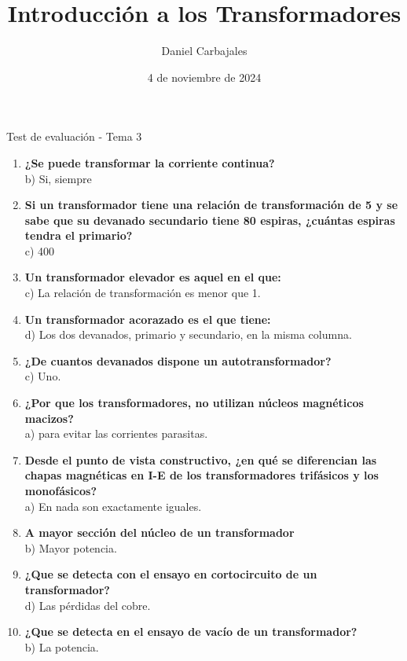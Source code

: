 \documentclass[spanish]{report}
\title{\Huge{Introducción a los Transformadores}}
\author{\large{Daniel Carbajales}}
\date{4 de noviembre de 2024}
\begin{document}

\begin{huge}
  \begin{center}
    Test de evaluación - Tema 3
  \end{center}
  \vspace{1em}
\end{huge}
  \begin{enumerate}
    \item{\textbf{¿Se puede transformar la corriente continua?}}\\
        b) Si, siempre
    \item{\textbf{Si un transformador tiene una relación de transformación de 5
      y se sabe que su devanado secundario tiene 80 espiras,
      ¿cuántas espiras tendra el primario?}}\\
        c) 400
    \item{\textbf{Un transformador elevador es aquel en el que:}}\\
        c) La relación de transformación es menor que 1.
    \item{\textbf{Un transformador acorazado es el que tiene:}}\\
        d) Los dos devanados, primario y secundario, en la misma columna.
    \item{\textbf{¿De cuantos devanados dispone un autotransformador?}}\\
        c) Uno.
    \item{\textbf{¿Por que los transformadores, no utilizan núcleos magnéticos macizos? }}\\
        a) para evitar las corrientes parasitas.
    \item{\textbf{Desde el punto de vista constructivo, ¿en qué se diferencian las chapas magnéticas en I-E de los transformadores trifásicos y los monofásicos?}}\\
        a) En nada son exactamente iguales.
    \item{\textbf{A mayor sección del núcleo de un transformador }}\\
        b) Mayor potencia.
    \item{\textbf{¿Que se detecta con el ensayo en cortocircuito de un transformador?}}\\
        d) Las pérdidas del cobre.
    \item{\textbf{¿Que se detecta en el ensayo de vacío de un transformador?}}\\
        b) La potencia.
  \end{enumerate}
\end{document}
